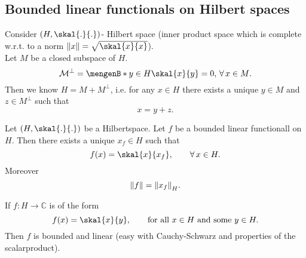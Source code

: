 

\subsection{Bounded linear functionals on Hilbert spaces} 
\label{sub:bounded_linear_functionals_on_hilbert_spaces}

Consider $(H, \skal{.}{.})$- Hilbert space (inner product space which is complete w.r.t. to a norm $\norm{x}= \sqrt{\skal{x}{x}}$). \\
Let $M$ be a closed subspace of $H$. 
\[
	\mathcal{M}^{\perp} = \set[y \in H]{\skal{x}{y}= 0, \, \forall\,  x \in M}.
\]
Then we know $H = M + M^{\perp}$, i.e. for any $x \in H$ there exists a unique $y \in M$ and $z \in M^{\perp}$ such that
\[
	x = y + z.
\]
\begin{theorem}
	Let $(H, \skal{.}{.})$ be a Hilbertspace. Let $f$ be a bounded linear functionall on $H$. Then there exists a unique $x_f \in H$ such that
	\[
		f(x) = \skal{x}{x_f}, \qquad \forall\,  x \in H.
	\]
	Moreover \[
		\norm{f} = \norm{x_f}_H.
	\]
\end{theorem}
\begin{bemerkung}
	If $f: H \to \mathbb{C}$ is of the form
	\[
		f(x) = \skal{x}{y}, \qquad \text{for all } x \in H \text{ and some }y \in H.
	\]
	Then $f$ is bounded and linear (easy with Cauchy-Schwarz and properties of the scalarproduct).
\end{bemerkung}
